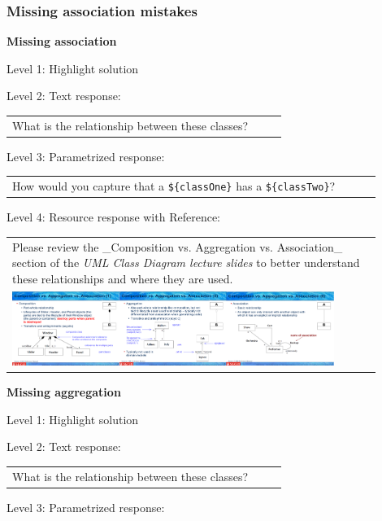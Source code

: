 \subsubsection{Missing association mistakes}

\noindent \textbf{Missing association} \medskip

\noindent Level 1: Highlight solution \medskip

\noindent Level 2: Text response: \medskip

\begin{tabular}{|p{0.9\linewidth}}
What is the relationship between these classes?
\end{tabular} \medskip

\noindent Level 3: Parametrized response: \medskip

\begin{tabular}{|p{0.9\linewidth}}
How would you capture that a \verb|${classOne}| has a \verb|${classTwo}|?
\end{tabular} \medskip

\noindent Level 4: Resource response with Reference: \medskip

\begin{tabular}{|p{0.9\linewidth}}
Please review the _Composition vs. Aggregation vs. Association_ section of 
the \textit{UML Class Diagram lecture slides} to 
better understand these relationships and where they are used.

\\
\includegraphics[width=0.9\textwidth]{images/composition_aggregation_association.png}
\end{tabular} \medskip


\noindent \textbf{Missing aggregation} \medskip

\noindent Level 1: Highlight solution \medskip

\noindent Level 2: Text response: \medskip

\begin{tabular}{|p{0.9\linewidth}}
What is the relationship between these classes?
\end{tabular} \medskip

\noindent Level 3: Parametrized response: \medskip

